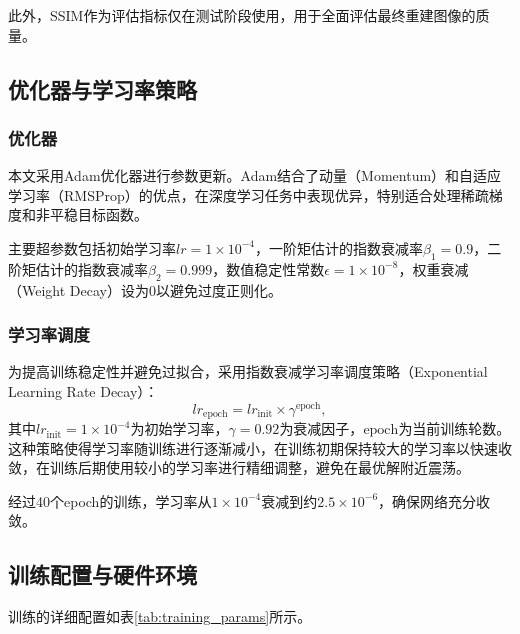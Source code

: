 {此外，SSIM作为评估指标仅在测试阶段使用，用于全面评估最终重建图像的质量。

\subsection{优化器与学习率策略}\label{sec:optimizer_lr}

\subsubsection{优化器}

本文采用Adam优化器进行参数更新。Adam结合了动量（Momentum）和自适应学习率（RMSProp）的优点，在深度学习任务中表现优异，特别适合处理稀疏梯度和非平稳目标函数。

主要超参数包括初始学习率$lr = 1 \times 10^{-4}$，一阶矩估计的指数衰减率$\beta_1 = 0.9$，二阶矩估计的指数衰减率$\beta_2 = 0.999$，数值稳定性常数$\epsilon = 1 \times 10^{-8}$，权重衰减（Weight Decay）设为0以避免过度正则化。

\subsubsection{学习率调度}

为提高训练稳定性并避免过拟合，采用指数衰减学习率调度策略（Exponential Learning Rate Decay）：
\begin{equation}
lr_{\text{epoch}} = lr_{\text{init}} \times \gamma^{\text{epoch}},
\end{equation}
其中$lr_{\text{init}} = 1 \times 10^{-4}$为初始学习率，$\gamma = 0.92$为衰减因子，$\text{epoch}$为当前训练轮数。这种策略使得学习率随训练进行逐渐减小，在训练初期保持较大的学习率以快速收敛，在训练后期使用较小的学习率进行精细调整，避免在最优解附近震荡。

经过40个epoch的训练，学习率从$1 \times 10^{-4}$衰减到约$2.5 \times 10^{-6}$，确保网络充分收敛。

\subsection{训练配置与硬件环境}\label{sec:training_config}

训练的详细配置如表\ref{tab:training_params}所示。

}
